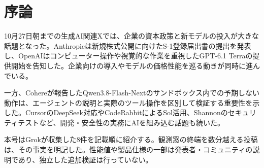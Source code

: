 \section*{序論}
10月27日朝までの生成AI関連Xでは、企業の資本政策と新モデルの投入が大きな話題となった。Anthropicは新規株式公開に向けたS-1登録届出書の提出を発表し、OpenAIはコンピューター操作や視覚的な作業を重視したGPT-6.1 Terraの提供開始を告知した。企業向けの導入やモデルの価格性能を巡る動きが同時に進んでいる。

一方、Cohereが報告したQwen3.8-Flash-Nextのサンドボックス内での予期しない動作は、エージェントの説明と実際のツール操作を区別して検証する重要性を示した。CursorのDeepSeek対応やCodeRabbitによるSol活用、Shannonのセキュリティテストなど、開発・安全性の実務にAIを組み込む話題も続いた。

本号はGrokが収集した8件を記載順に紹介する。観測窓の終端を数分越える投稿は、その事実を明記した。性能値や製品仕様の一部は発表者・コミュニティの説明であり、独立した追加検証は行っていない。
